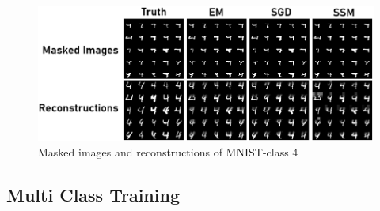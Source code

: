 \begin{figure}[H]
    \centering
    \includegraphics[width=\textwidth]{figures/einsum/mnist/reconstructions_4.png}
    \caption{Masked images and reconstructions of MNIST-class 4}
\end{figure}

\subsection{Multi Class Training}
\label{sec:exp_mnist_multi}


